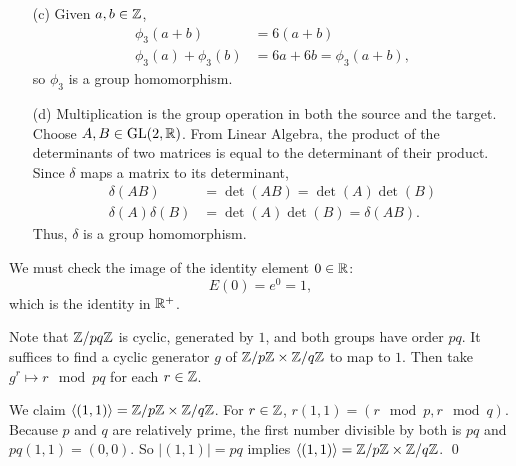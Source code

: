 \documentclass[../algebraNotesMSRI-UP2016.tex]{subfiles}
\begin{document}
\begin{frame}
\begin{itemize}
\item[(c)] Given $a,b\in\mathbb Z$,
\begin{align*}
\phi_3(a+b) &= 6(a+b) \\
\phi_3(a)+\phi_3(b) &= 6a+6b=\phi_3(a+b),
\end{align*}
so $\phi_3$ is a group homomorphism.

\smallGap
\item[(d)]
Multiplication is the group operation in both the source and the target.  Choose $A,B\in\operatorname{GL}(2,\mathbb R)$.  From Linear Algebra, the product of the determinants of two matrices is equal to the determinant of their product.  Since $\delta$ maps a matrix to its determinant,
\begin{align*}
\delta(AB) &= \det{(AB)} = \det(A)\det(B) \\
\delta(A)\delta(B) &= \det(A)\det(B) = \delta(AB).
\end{align*}
Thus, $\delta$ is a group homomorphism.
\end{itemize}
\end{frame}

\begin{frame}
We must check the image of the identity element $0\in \mathbb R$:
\[
E(0)=e^0=1,
\]
which is the identity in $\mathbb R^+$.

\smallGap
{}
Note that $\mathbb Z/pq\mathbb Z$ is cyclic, generated by $1$, and both groups have order $pq$.  It suffices to find a cyclic generator $g$ of $\mathbb Z/p\mathbb Z\times \mathbb Z/q\mathbb Z$ to map to $1$.  Then take $g^r\mapsto r\mod{pq}$ for each $r\in \mathbb Z$.  

\smallGap 
We claim $\langle (1,1)\rangle =\mathbb Z/p\mathbb Z\times \mathbb Z/q\mathbb Z$.  For $r\in \mathbb Z$, $r(1,1)=(r\mod p,r\mod q)$.  Because $p$ and $q$ are relatively prime, the first number divisible by both is $pq$ and $pq(1,1)=(0,0)$.  So $|(1,1)|=pq$ implies $\langle (1,1)\rangle =\mathbb Z/p\mathbb Z\times \mathbb Z/q\mathbb Z$.
\qed 
\end{frame}
\end{document}
